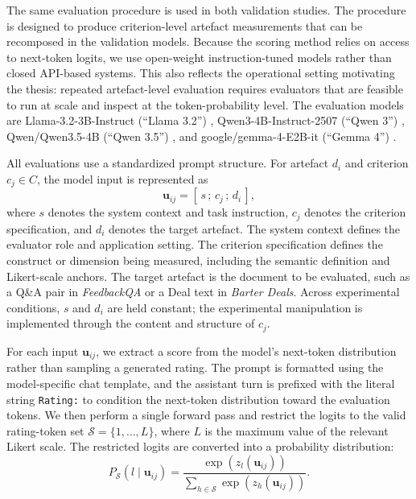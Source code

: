 The same evaluation procedure is used in both validation studies. The procedure is designed to produce criterion-level artefact measurements that can be recomposed in the validation models. Because the scoring method relies on access to next-token logits, we use open-weight instruction-tuned models rather than closed API-based systems. This also reflects the operational setting motivating the thesis: repeated artefact-level evaluation requires evaluators that are feasible to run at scale and inspect at the token-probability level. The evaluation models are Llama-3.2-3B-Instruct (``Llama 3.2'') \citep{metaLlama323BInstruct2024}, Qwen3-4B-Instruct-2507 (``Qwen 3'') \citep{qwen3technicalreport}, Qwen/Qwen3.5-4B (``Qwen 3.5'') \citep{qwen35_4b_modelcard}, and google/gemma-4-E2B-it (``Gemma 4'') \citep{googleGemma4E2BIt2026}.

All evaluations use a standardized prompt structure. For artefact $d_i$ and criterion $c_j \in C$, the model input is represented as
\[
    \mathbf{u}_{ij} = [\, s \,;\, c_j \,;\, d_i \,],
\]
where $s$ denotes the system context and task instruction, $c_j$ denotes the criterion specification, and $d_i$ denotes the target artefact. The system context defines the evaluator role and application setting. The criterion specification defines the construct or dimension being measured, including the semantic definition and Likert-scale anchors. The target artefact is the document to be evaluated, such as a Q\&A pair in \textit{FeedbackQA} or a Deal text in \textit{Barter Deals}. Across experimental conditions, $s$ and $d_i$ are held constant; the experimental manipulation is implemented through the content and structure of $c_j$.

For each input $\mathbf{u}_{ij}$, we extract a score from the model's next-token distribution rather than sampling a generated rating. The prompt is formatted using the model-specific chat template, and the assistant turn is prefixed with the literal string \texttt{Rating:} to condition the next-token distribution toward the evaluation tokens. We then perform a single forward pass and restrict the logits to the valid rating-token set $\mathcal{S}=\{1,\ldots,L\}$, where $L$ is the maximum value of the relevant Likert scale. The restricted logits are converted into a probability distribution:
\begin{equation}
P_{\mathcal{S}}(l \mid \mathbf{u}_{ij}) =
\frac{\exp(z_l(\mathbf{u}_{ij}))}
{\sum_{h \in \mathcal{S}} \exp(z_h(\mathbf{u}_{ij}))}.
\end{equation}

